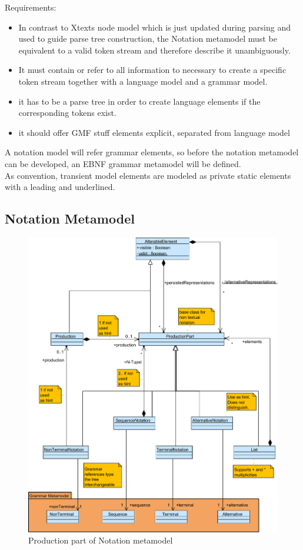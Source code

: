 Requirements:
\begin{itemize}
	\item In contrast to Xtexts node model which is just updated during parsing and used to guide parse tree construction, the Notation metamodel must be equivalent to a valid token stream and therefore describe it unambiguously. 
	\item It must contain or refer to all information to necessary to create a specific token stream together with a language model and a grammar model.   
	\item it has to be a parse tree in order to create language elements if the corresponding tokens exist.
	\item it should offer GMF stuff elements 
	explicit, separated from language model
\end{itemize}

A notation model will refer grammar elements, so before the notation metamodel can be developed, an EBNF grammar metamodel will be defined. \\

As convention, transient model elements are modeled as private static elements with a leading \code{-} and underlined.


\subsection{Notation Metamodel}
\begin{figure}
\centering
\includegraphics[scale=0.65]{gfx/ex/Notation_Prod} 
\caption{Production part of Notation metamodel}
\label{MM:Not:Prod}
\end{figure}

